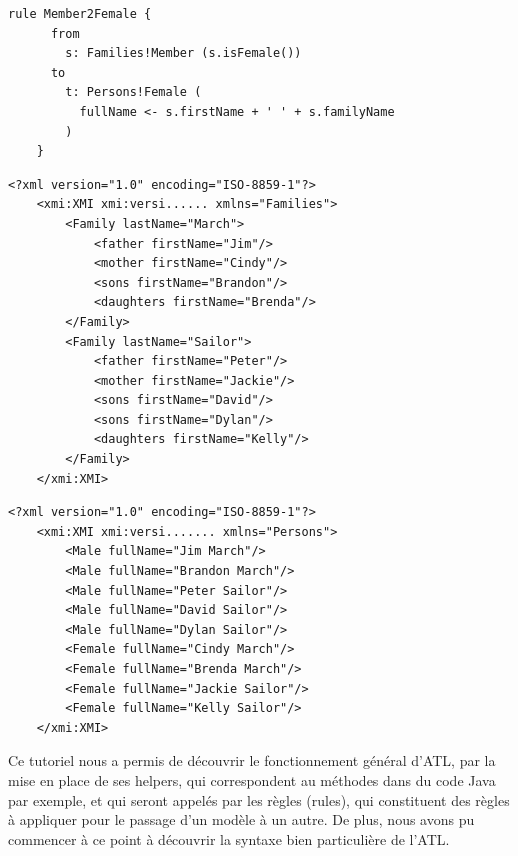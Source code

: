 \documentclass[french, 12pt, a4paper]{article}
\begin{document}
	\begin{lstlisting}[caption={Une règle définie en ATL. Celle-ci détermine le genre du membre de la famille en utilisant le helper défini au dessus.}]
    rule Member2Female {
      from
        s: Families!Member (s.isFemale())
      to
        t: Persons!Female (
          fullName <- s.firstName + ' ' + s.familyName
        )
    }
	\end{lstlisting}
	
	
	\begin{lstlisting}[caption={Le modèle source défini en XML. Celui-ci a bien une structure de famille, et nous cherchons à changer cette structure pour obtenir une simple liste de personnes.}]
    <?xml version="1.0" encoding="ISO-8859-1"?>
    <xmi:XMI xmi:versi...... xmlns="Families">
    	<Family lastName="March">
    		<father firstName="Jim"/>
    		<mother firstName="Cindy"/>
    		<sons firstName="Brandon"/>
    		<daughters firstName="Brenda"/>
    	</Family>
    	<Family lastName="Sailor">
    		<father firstName="Peter"/>
    		<mother firstName="Jackie"/>
    		<sons firstName="David"/>
    		<sons firstName="Dylan"/>
    		<daughters firstName="Kelly"/>
    	</Family>
    </xmi:XMI>

	\end{lstlisting}

	\begin{lstlisting}[caption={Le modèle cible défini en XML, et généré automatiquement par Eclipse grâce aux métamodèles et aux règles définies précedement en ATL. Nous obtenons bien une structure de la forme liste de personnes.}]
    <?xml version="1.0" encoding="ISO-8859-1"?>
    <xmi:XMI xmi:versi....... xmlns="Persons">
    	<Male fullName="Jim March"/>
    	<Male fullName="Brandon March"/>
    	<Male fullName="Peter Sailor"/>
    	<Male fullName="David Sailor"/>
    	<Male fullName="Dylan Sailor"/>
    	<Female fullName="Cindy March"/>
    	<Female fullName="Brenda March"/>
    	<Female fullName="Jackie Sailor"/>
    	<Female fullName="Kelly Sailor"/>
    </xmi:XMI>

	\end{lstlisting}
    
Ce tutoriel nous a permis de découvrir le fonctionnement général d'ATL, par la mise en place de ses helpers, qui correspondent au méthodes dans du code Java par exemple, et qui seront appelés par les règles (rules), qui constituent des règles à appliquer pour le passage d'un modèle à un autre. De plus, nous avons pu commencer à ce point à découvrir la syntaxe bien particulière de l'ATL.
\end{document}
